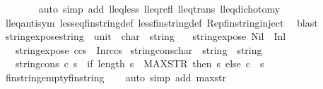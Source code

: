 \begin{isabellebody}
\ \ \ \ \ \ \isamarkupfalse%
\ {\isacharparenleft}auto\ simp\ add{\isacharcolon}\ lleq{\isacharunderscore}less\ lleq{\isacharunderscore}refl\ lleq{\isacharunderscore}trans\ lleq{\isacharunderscore}dichotomy{\isacharparenright}\isanewline
\ \ \isamarkupfalse%
\ lleq{\isacharunderscore}antisym\ less{\isacharunderscore}eq{\isacharunderscore}fin{\isacharunderscore}string{\isacharunderscore}def\ less{\isacharunderscore}fin{\isacharunderscore}string{\isacharunderscore}def\ Rep{\isacharunderscore}fin{\isacharunderscore}string{\isacharunderscore}inject\ \isamarkupfalse%
\ blast%
\endisatagproof
{\isafoldproof}%
%
\isadelimproof
\isanewline
%
\endisadelimproof
{}\isamarkupfalse%
\isanewline
\isanewline
{}\isamarkupfalse%
\ string{\isacharunderscore}expose{\isacharcolon}{\isacharcolon}{\isachardoublequoteopen}string\ {\isasymRightarrow}\ {\isacharparenleft}unit\ {\isacharplus}\ {\isacharparenleft}char\ {\isacharasterisk}\ string{\isacharparenright}{\isacharparenright}{\isachardoublequoteclose}\isanewline
\ \ \ {\isachardoublequoteopen}string{\isacharunderscore}expose\ Nil\ {\isacharequal}\ Inl\ {\isacharparenleft}{\isacharparenright}{\isachardoublequoteclose}\isanewline
\ \ {\isacharbar}\ {\isachardoublequoteopen}string{\isacharunderscore}expose\ {\isacharparenleft}c{\isacharhash}cs{\isacharparenright}\ {\isacharequal}\ Inr{\isacharparenleft}c{\isacharcomma}cs{\isacharparenright}{\isachardoublequoteclose}\isanewline
\isanewline
{}\isamarkupfalse%
\ string{\isacharunderscore}cons{\isacharcolon}{\isacharcolon}{\isachardoublequoteopen}char\ {\isasymRightarrow}\ string\ {\isasymRightarrow}\ string{\isachardoublequoteclose}\isanewline
\ \ \ {\isachardoublequoteopen}string{\isacharunderscore}cons\ c\ s\ {\isacharequal}\ {\isacharparenleft}if\ length\ s\ {\isasymge}\ MAX{\isacharunderscore}STR\ then\ s\ else\ c\ {\isacharhash}\ s{\isacharparenright}{\isachardoublequoteclose}\ \isanewline
\isanewline
{}\isamarkupfalse%
\ fin{\isacharunderscore}string{\isacharunderscore}empty{\isacharcolon}{\isacharcolon}fin{\isacharunderscore}string\ \ {\isachardoublequoteopen}{\isacharprime}{\isacharprime}{\isacharprime}{\isacharprime}{\isachardoublequoteclose}%
\isadelimproof
\ %
\endisadelimproof
%
\isatagproof
{}\isamarkupfalse%
{\isacharparenleft}auto\ simp\ add{\isacharcolon}\ max{\isacharunderscore}str{\isacharparenright}%
\endisatagproof
{\isafoldproof}%
%
\isadelimproof
%
\endisadelimproof

\end{isabellebody}
